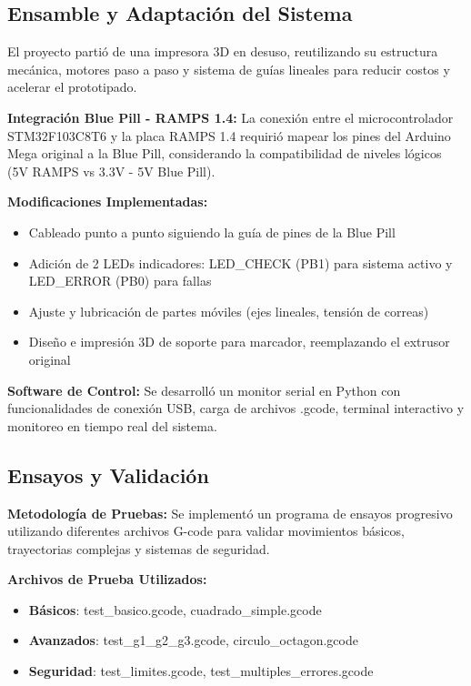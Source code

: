 \documentclass[12pt]{article}
\begin{document}
\subsection{Ensamble y Adaptación del Sistema}

El proyecto partió de una impresora 3D en desuso, reutilizando su estructura mecánica, motores paso a paso y sistema de guías lineales para reducir costos y acelerar el prototipado.

\textbf{Integración Blue Pill - RAMPS 1.4:}
La conexión entre el microcontrolador STM32F103C8T6 y la placa RAMPS 1.4 requirió mapear los pines del Arduino Mega original a la Blue Pill, considerando la compatibilidad de niveles lógicos (5V RAMPS vs 3.3V - 5V Blue Pill).

\textbf{Modificaciones Implementadas:}
\begin{itemize}
    \item Cableado punto a punto siguiendo la guía de pines de la Blue Pill
    \item Adición de 2 LEDs indicadores: LED\_CHECK (PB1) para sistema activo y LED\_ERROR (PB0) para fallas
    \item Ajuste y lubricación de partes móviles (ejes lineales, tensión de correas)
    \item Diseño e impresión 3D de soporte para marcador, reemplazando el extrusor original
\end{itemize}

\textbf{Software de Control:}
Se desarrolló un monitor serial en Python con funcionalidades de conexión USB, carga de archivos .gcode, terminal interactivo y monitoreo en tiempo real del sistema.

\subsection{Ensayos y Validación}

\textbf{Metodología de Pruebas:}
Se implementó un programa de ensayos progresivo utilizando diferentes archivos G-code para validar movimientos básicos, trayectorias complejas y sistemas de seguridad.

\textbf{Archivos de Prueba Utilizados:}
\begin{itemize}
    \item \textbf{Básicos}: test\_basico.gcode, cuadrado\_simple.gcode
    \item \textbf{Avanzados}: test\_g1\_g2\_g3.gcode, circulo\_octagon.gcode
    \item \textbf{Seguridad}: test\_limites.gcode, test\_multiples\_errores.gcode
\end{itemize}
\end{document}
